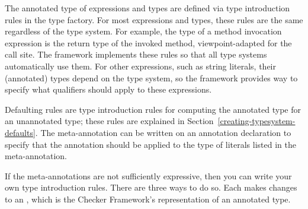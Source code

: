 The annotated type of expressions and types are defined via type introduction rules in the
type factory.  For most expressions and types, these rules are the same regardless of the type system.
For example, the type of a method invocation expression is the return type of the invoked method,
viewpoint-adapted for the call site.  The framework implements these rules so that all type systems
automatically use them.  For other expressions, such as string literals, their (annotated) types depend
on the type system, so the framework provides way to specify what qualifiers should apply to these expressions.

Defaulting rules are type introduction rules for computing the annotated type for an unannotated type;
these rules are explained in Section~\ref{creating-typesystem-defaults}. The meta-annotation  can be written on an annotation
declaration to specify that the annotation should be applied to the type of literals listed in the
meta-annotation.


If the meta-annotations are not sufficiently expressive, then you
can write your own type introduction rules.  There are three ways to do so.
Each makes changes to an ,
which is the Checker Framework's representation of an annotated type.


